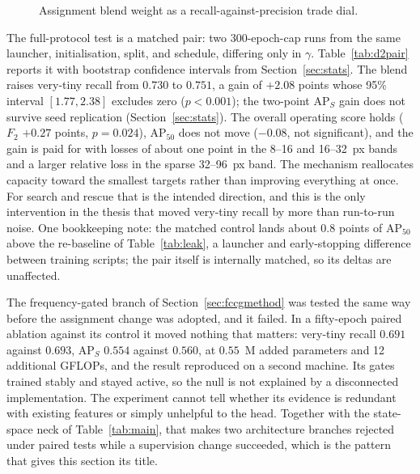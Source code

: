 \begin{figure}[tbp]
  \centering
  \caption{Assignment blend weight as a recall-against-precision trade dial.}
  \label{fig:gammadose}
\end{figure}

The full-protocol test is a matched pair: two 300-epoch-cap runs
from the same launcher, initialisation, split, and schedule, differing only in
$\gamma$. Table~\ref{tab:d2pair} reports it with bootstrap confidence
intervals from Section~\ref{sec:stats}. The blend raises very-tiny
recall from $0.730$ to $0.751$, a gain of $\mathbf{+2.08}$ points whose 95\%
interval $[1.77, 2.38]$ excludes zero ($p<0.001$); the two-point
$\mathrm{AP}_S$ gain does not survive seed replication
(Section~\ref{sec:stats}). The overall operating score
holds ($F_2$ $+0.27$ points, $p=0.024$), $\mathrm{AP}_{50}$ does not move
($-0.08$, not significant), and the gain is paid for with losses of about one
point in the 8--16 and 16--32~px bands and a larger relative loss in the
sparse 32--96~px band. The mechanism reallocates capacity toward the smallest
targets rather than improving everything at once. For search and rescue that
is the intended direction, and this is the only intervention in the thesis
that moved very-tiny recall by more than run-to-run noise. One bookkeeping note: the
matched control lands about $0.8$ points of $\mathrm{AP}_{50}$ above the
re-baseline of Table~\ref{tab:leak}, a launcher and early-stopping difference
between training scripts; the pair itself is internally matched, so its deltas
are unaffected.

The frequency-gated branch of Section~\ref{sec:fccgmethod} was tested the same
way before the assignment change was adopted, and it failed. In a fifty-epoch
paired ablation against its control it moved nothing that matters: very-tiny
recall $0.691$ against $0.693$, $\mathrm{AP}_S$ $0.554$ against $0.560$, at
$0.55$~M added parameters and 12 additional GFLOPs, and the result reproduced
on a second machine. Its gates trained stably and stayed active, so the null is
not explained by a disconnected implementation. The experiment cannot tell
whether its evidence is redundant with existing features or simply unhelpful
to the head. Together with the state-space neck of
Table~\ref{tab:main}, that makes two architecture branches rejected under
paired tests while a supervision change succeeded, which is the pattern that
gives this section its title.


